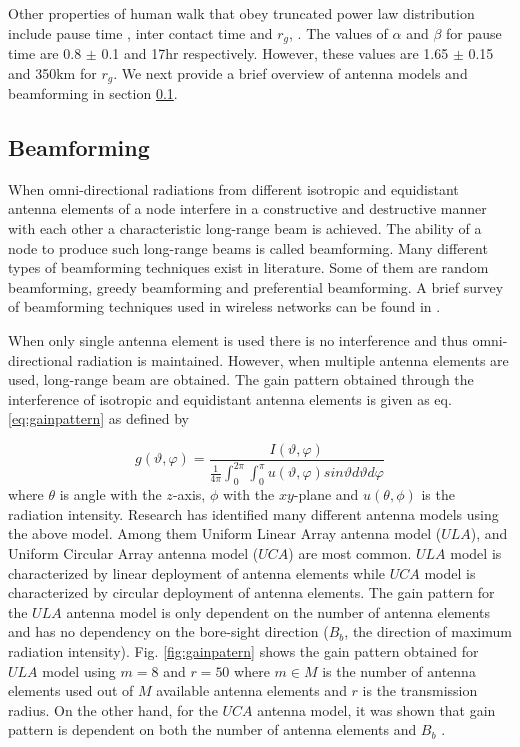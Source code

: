 \documentclass[preprint, twocolumn,5p]{elsarticle}
\begin{document}
    Other properties of human walk that obey truncated power law distribution include pause time \cite{Song2010a}, inter contact time \cite{Chaintreau2006} and $r_{g}$, \cite{Gonzalez2008}. The values of $\alpha$ and $\beta$ for pause time are 0.8 $\pm$ 0.1 and 17hr respectively. However, these values are 1.65 $\pm$ 0.15 and 350km for $r_{g}$.  We next provide a brief overview of antenna models and beamforming in section \ref{subsec:beamform}.

    \subsection{Beamforming}\label{subsec:beamform}

    When omni-directional radiations from different isotropic and equidistant antenna elements of a node interfere in a constructive and destructive manner with each other a characteristic long-range beam is achieved. The ability of a node to produce such long-range beams is called beamforming. Many different types of beamforming techniques exist in literature. Some of them are random beamforming, greedy beamforming and preferential beamforming. A brief survey of beamforming techniques used in wireless networks can be found in \cite{Agarwal2012}.

    When only single antenna element is used there is no interference and thus omni-directional radiation is maintained. However, when multiple antenna elements are used, long-range beam are obtained. The gain pattern obtained through the interference of isotropic and equidistant antenna elements is given as eq. \ref{eq:gainpattern} as defined by \cite{Balanis1997,Bettstetter2005}

    \begin{equation}\label{eq:gainpattern}
        g(\vartheta,\varphi)=\frac{I(\vartheta,\varphi)}{\frac{1}{4\pi} \int_{0}^{2\pi }\int_{0}^{\pi }u(\vartheta,\varphi) sin\vartheta d\vartheta d\varphi}
    \end{equation}
    where $\theta$ is angle with the $z$-axis, $\phi$ with the $xy$-plane and $u(\theta,\phi)$ is the radiation intensity. Research has identified many different antenna models using the above model. Among them Uniform Linear Array antenna model ($ULA$), and Uniform Circular Array antenna model ($UCA$) are most common. $ULA$ model is characterized by linear deployment of antenna elements while $UCA$ model is characterized by circular deployment of antenna elements. The gain pattern for the $ULA$ antenna model is only dependent on the number of antenna elements and has no dependency on the bore-sight direction ($B_{b}$, the direction of maximum radiation intensity). Fig. \ref{fig:gainpatern} shows the gain pattern obtained for $ULA$ model using $m=8$ and $r=50$ where $m\in M$ is the number of antenna elements used out of $M$ available antenna elements and $r$ is the transmission radius. On the other hand, for the $UCA$ antenna model, it was shown that gain pattern is dependent on both the number of antenna elements and $B_{b}$ \cite{Bettstetter2005}.
\end{document}
